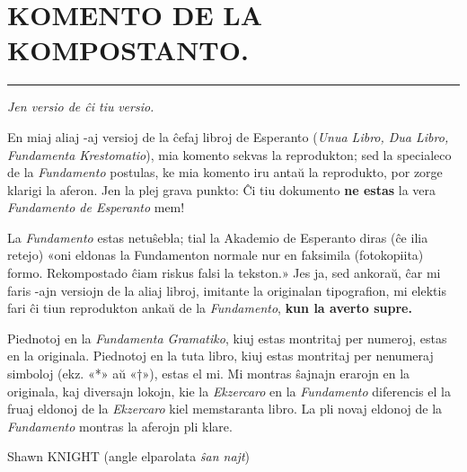 \fancyhead[C]{}
\titleformat{\chapter}[display]{\centering\sansfont}{\chaptertitlename}{0pt}{\Large}
\chapter*{KOMENTO DE LA KOMPOSTANTO.}

\begin{center}
\rule[0.5ex]{0.5\textwidth}{0.4pt}

\emph{Jen versio \laversio{} de ĉi tiu} \XeLaTeX{} \emph{versio.}
\end{center}

En miaj aliaj \XeLaTeX-aj versioj de la ĉefaj libroj de Esperanto (\emph{Unua Libro, Dua Libro, Fundamenta Krestomatio}), mia komento sekvas la reprodukton; sed la specialeco de la \emph{Fundamento} postulas, ke mia komento iru antaŭ la reprodukto, por zorge klarigi la aferon. Jen la plej grava punkto: Ĉi tiu dokumento \textbf{ne estas} la vera \emph{Fundamento de Esperanto} mem!

La \emph{Fundamento} estas netuŝebla; tial la Akademio de Esperanto diras (ĉe ilia retejo) «oni eldonas la Fundamenton normale nur en faksimila (fotokopiita) formo. Rekompostado ĉiam riskus falsi la tekston.» Jes ja, sed ankoraŭ, ĉar mi faris \XeLaTeX-ajn versiojn de la aliaj libroj, imitante la originalan tipografion, mi elektis fari ĉi tiun reprodukton ankaŭ de la \emph{Fundamento}, \textbf{kun la averto supre.}

Piednotoj en la \emph{Fundamenta Gramatiko}, kiuj estas montritaj per numeroj, estas en la originala. Piednotoj en la tuta libro, kiuj estas montritaj per nenumeraj simboloj (ekz. «\**» aŭ «†»), estas el mi.  Mi montras ŝajnajn erarojn en la originala, kaj diversajn lokojn, kie la \emph{Ekzercaro} en la \emph{Fundamento} diferencis el la fruaj eldonoj de la \emph{Ekzercaro} kiel memstaranta libro.  La pli novaj eldonoj de la \emph{Fundamento} montras la aferojn pli klare.

\vspace{1ex}

{\setlength{\parindent}{0em}
Shawn KNIGHT (angle elparolata \emph{ŝan najt})\\
\hodiau}
\titleformat{\chapter}[display]{\centering}{}{0pt}{\Large\bookman}